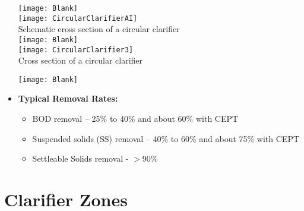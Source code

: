 \begin{itemize}
\begin{center}
				\texttt{[image: Blank]}\\
				\texttt{[image: CircularClarifierAI]}\\
				Schematic cross section of a circular clarifier\\
				\texttt{[image: Blank]}\\
				\texttt{[image: CircularClarifier3]}\\
				Cross section of a circular clarifier\\
			\end{center}
				\texttt{[image: Blank]}\\
\item \textbf{Typical Removal Rates:}\\
\begin{itemize}
\item \hspace{10mm} BOD removal – 25\% to 40\% and about 60\% with CEPT
\item \hspace{10mm} Suspended solids (SS) removal – 40\% to 60\% and about 75\% with CEPT
\item \hspace{10mm} Settleable Solids removal - $>$90\%
\end{itemize}
\end{itemize}

\section{Clarifier Zones}
				
